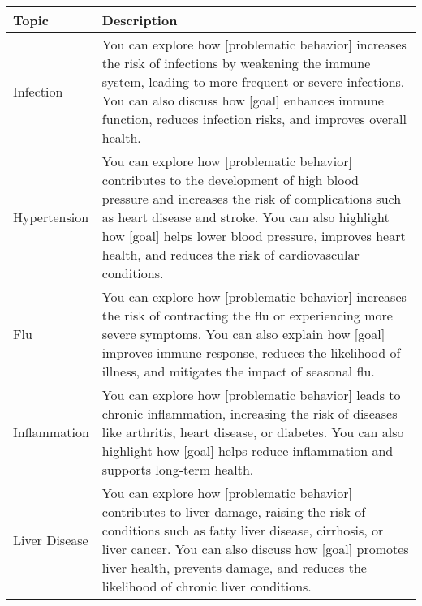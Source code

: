 \begin{table*}[tb]
\centering
\begin{tabularx}{\textwidth}{lX}
\toprule
Topic            & Description                                            \\ \midrule
Infection                   & You can explore how [problematic behavior] increases the risk of infections by weakening the immune system, leading to more frequent or severe infections. You can also discuss how [goal] enhances immune function, reduces infection risks, and improves overall health.                                                                                                                                                         \\ \hline
Hypertension                & You can explore how [problematic behavior] contributes to the development of high blood pressure and increases the risk of complications such as heart disease and stroke. You can also highlight how [goal] helps lower blood pressure, improves heart health, and reduces the risk of cardiovascular conditions.                                                                                                                 \\ \hline
Flu                         & You can explore how [problematic behavior] increases the risk of contracting the flu or experiencing more severe symptoms. You can also explain how [goal] improves immune response, reduces the likelihood of illness, and mitigates the impact of seasonal flu.                                                                                                                                                                  \\ \hline
Inflammation                & You can explore how [problematic behavior] leads to chronic inflammation, increasing the risk of diseases like arthritis, heart disease, or diabetes. You can also highlight how [goal] helps reduce inflammation and supports long-term health.                                                                                                                                                                                   \\ \hline
Liver Disease               & You can explore how [problematic behavior] contributes to liver damage, raising the risk of conditions such as fatty liver disease, cirrhosis, or liver cancer. You can also discuss how [goal] promotes liver health, prevents damage, and reduces the likelihood of chronic liver conditions.                                                                                                                                    \\ \hline

\end{tabularx}
\end{table*}
